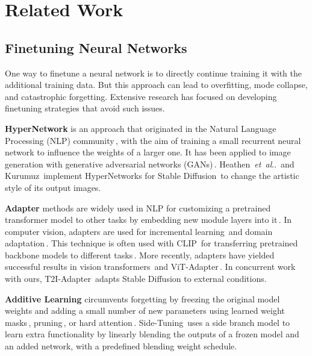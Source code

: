 \documentclass[10pt,twocolumn,letterpaper]{article}
\makeatletter
\DeclareRobustCommand\onedot{\futurelet\@let@token\@onedot}
\def\@onedot{\ifx\@let@token.\else.\null\fi\xspace}
\def\etal{\emph{et~al}\onedot}
\def\para#1{\vspace{0.25em}\noindent\textbf{#1}}
\makeatother
\begin{document}
	\section{Related Work}
	\label{sec:related}
	
	\subsection{Finetuning Neural Networks}
	
	\noindent One way to finetune a neural network is to directly continue training
	it with the additional training data. But this approach can lead to
	overfitting, mode collapse, and catastrophic forgetting.  Extensive
	research has focused on developing finetuning strategies that avoid
	such issues.
	
	\para{HyperNetwork} is an approach that originated in the Natural
	Language Processing (NLP) community\,\cite{ha2017hypernetworks}, with
	the aim of training a small recurrent neural network to influence the
	weights of a larger one.  It has been applied to image generation with
	generative adversarial networks (GANs)\,\cite{alaluf2022hyperstyle,
		dinh2022hyperinverter}.  Heathen~\etal\,\cite{heathen} and Kurumuz\,\cite{nai} implement
	HyperNetworks for Stable Diffusion\,\cite{rombach2021highresolution}
	to change the artistic style of its output images.
	
	\para{Adapter} methods are widely used in NLP for customizing a
	pretrained transformer model to other tasks by embedding new module
	layers into it\,\cite{houlsby2019parameter,stickland2019bert}.  In
	computer vision, adapters are used for incremental
	learning\,\cite{rosenfeld2018incremental} and domain
	adaptation\,\cite{rebuffi2018efficient}.  This technique is often used
	with CLIP\,\cite{radford2021learning} for transferring pretrained
	backbone models to different
	tasks\,\cite{gao2021clip,radford2021learning,sung2021vl,zhang2021tip}.
	More recently, adapters have yielded successful results in vision
	transformers\,\cite{li2022exploring,li2021benchmarking} and
	ViT-Adapter\,\cite{chen2022vision}.  In concurrent work with ours,
	T2I-Adapter\,\cite{mou2023t2i} adapts Stable Diffusion to external
	conditions. 
	
	\para{Additive Learning} circumvents forgetting by freezing the
	original model weights and adding a small number of new parameters using learned weight
	masks\,\cite{mallya2018piggyback,rosenfeld2018incremental},
	pruning\,\cite{mallya2018packnet}, or hard
	attention\,\cite{serra2018overcoming}.
	Side-Tuning\,\cite{zhang2020side} uses a side branch model to learn
	extra functionality by linearly blending the outputs of a frozen model
	and an added network, with a predefined blending weight schedule.
	
\end{document}
